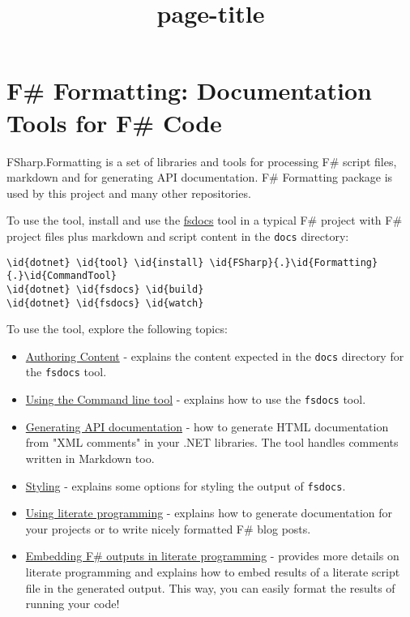 \documentclass{article}
\title{{page-title}}
\date{}
\newcommand{\id}[1]{\textcolor{black}{#1}}
\begin{document}
\maketitle

\section*{F\# Formatting: Documentation Tools for F\# Code}



FSharp.Formatting is a set of libraries and tools for processing F\# script files, markdown and for
generating API documentation. F\# Formatting package is used by this project and many other repositories.


To use the tool, install and use the \href{commandline.html}{fsdocs} tool in a typical F\# project with
F\# project files plus markdown and script content in the \texttt{docs} directory:
\begin{Verbatim}[commandchars=\\\{\}]
\id{dotnet} \id{tool} \id{install} \id{FSharp}{.}\id{Formatting}{.}\id{CommandTool}
\id{dotnet} \id{fsdocs} \id{build} 
\id{dotnet} \id{fsdocs} \id{watch}

\end{Verbatim}



To use the tool, explore the following topics:
\begin{itemize}
\item 

\href{content.html}{Authoring Content} - explains the content expected in the \texttt{docs} directory for the \texttt{fsdocs} tool.

\item 

\href{commandline.html}{Using the Command line tool} - explains how to use the \texttt{fsdocs} tool.

\item 

\href{apidocs.html}{Generating API documentation} - how to generate HTML documentation
from "XML comments" in your .NET libraries. The tool handles comments written in
Markdown too.

\item 

\href{styling.html}{Styling} - explains some options for styling the output of \texttt{fsdocs}.

\item 

\href{literate.html}{Using literate programming} - explains how to generate documentation
for your projects or to write nicely formatted F\# blog posts.

\item 

\href{evaluation.html}{Embedding F\# outputs in literate programming} - provides more details on literate programming and
explains how to embed results of a literate script file in the generated output. This way,
you can easily format the results of running your code!

\end{itemize}
\end{document}
